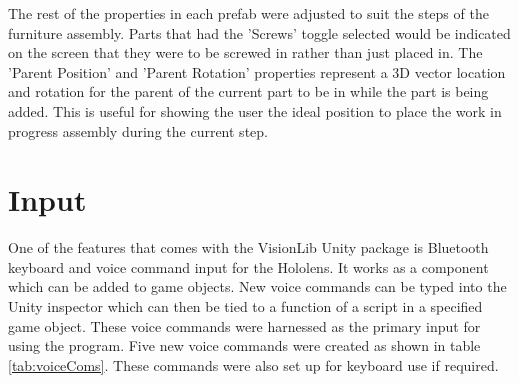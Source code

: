 \documentclass{l4proj}
\begin{document}
The rest of the properties in each prefab were adjusted to suit the steps of the furniture assembly. Parts that had the 'Screws' toggle selected would be indicated on the screen that they were to be screwed in rather than just placed in. The 'Parent Position' and 'Parent Rotation' properties represent a 3D vector location and rotation for the parent of the current part to be in while the part is being added. This is useful for showing the user the ideal position to place the work in progress assembly during the current step.

\section{Input}

One of the features that comes with the VisionLib Unity package is Bluetooth keyboard and voice command input for the Hololens. It works as a component which can be added to game objects. New voice commands can be typed into the Unity inspector which can then be tied to a function of a script in a specified game object. These voice commands were harnessed as the primary input for using the program. Five new voice commands were created as shown in table \ref{tab:voiceComs}. These commands were also set up for keyboard use if required.
\end{document}
